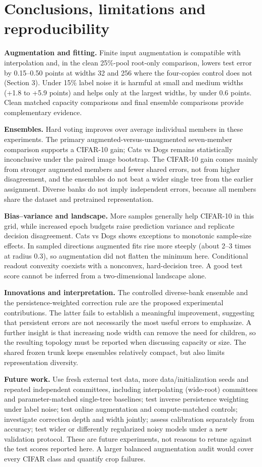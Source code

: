 \documentclass[11pt,a4paper]{article}
\begin{document}
\section{Conclusions, limitations and reproducibility}
\textbf{Augmentation and fitting.} Finite input augmentation is compatible with interpolation and, in the clean 25\%-pool root-only comparison, lowers test error by 0.15--0.50 points at widths 32 and 256 where the four-copies control does not (Section 3). Under 15\% label noise it is harmful at small and medium widths (+1.8 to +5.9 points) and helps only at the largest widths, by under 0.6 points. Clean matched capacity comparisons and final ensemble comparisons provide complementary evidence.

\textbf{Ensembles.} Hard voting improves over average individual members in these experiments. The primary augmented-versus-unaugmented seven-member comparison supports a CIFAR-10 gain; Cats vs Dogs remains statistically inconclusive under the paired image bootstrap. The CIFAR-10 gain comes mainly from stronger augmented members and fewer shared errors, not from higher disagreement, and the ensembles do not beat a wider single tree from the earlier assignment. Diverse banks do not imply independent errors, because all members share the dataset and pretrained representation.

\textbf{Bias--variance and landscape.} More samples generally help CIFAR-10 in this grid, while increased epoch budgets raise prediction variance and replicate decision disagreement. Cats vs Dogs shows exceptions to monotonic sample-size effects. In sampled directions augmented fits rise more steeply (about 2--3 times at radius 0.3), so augmentation did not flatten the minimum here. Conditional readout convexity coexists with a nonconvex, hard-decision tree. A good test score cannot be inferred from a two-dimensional landscape alone.

\textbf{Innovations and interpretation.} The controlled diverse-bank ensemble and the persistence-weighted correction rule are the proposed experimental contributions. The latter fails to establish a meaningful improvement, suggesting that persistent errors are not necessarily the most useful errors to emphasize. A further insight is that increasing node width can remove the need for children, so the resulting topology must be reported when discussing capacity or size. The shared frozen trunk keeps ensembles relatively compact, but also limits representation diversity.

\textbf{Future work.} Use fresh external test data, more data/initialization seeds and repeated independent committees, including interpolating (wide-root) committees and parameter-matched single-tree baselines; test inverse persistence weighting under label noise; test online augmentation and compute-matched controls; investigate correction depth and width jointly; assess calibration separately from accuracy; test wider or differently regularized noisy models under a new validation protocol. These are future experiments, not reasons to retune against the test scores reported here. A larger balanced augmentation audit would cover every CIFAR class and quantify crop failures.
\end{document}
